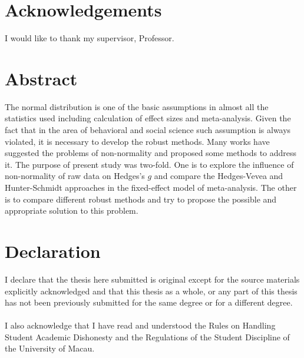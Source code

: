 \documentclass[a4paper, 12pt, twoside]{article}
\begin{document}
\newpage\null\thispagestyle{empty}\newpage

\restoregeometry
\setcounter{page}{1}
\section*{\centering \bf \normalsize{Acknowledgements}}

I would like to thank my supervisor, Professor. \\
\lipsum[1]
\newpage

\section*{\centering \bf \normalsize{Abstract}}
The normal distribution is one of the basic assumptions in almost all the statistics used including calculation of effect sizes and meta-analysis. Given the fact that in the area of behavioral and social science such assumption is always violated, it is necessary to develop the robust methods. Many works have suggested the problems of non-normality and proposed some methods to address it. The purpose of present study was two-fold. One is to explore the influence of non-normality of raw data on Hedges's $g$ and compare the Hedges-Vevea and Hunter-Schmidt approaches in the fixed-effect model of meta-analysis. The other is to compare different robust methods and try to propose the possible and appropriate solution to this problem.
\newpage

\section*{\centering \bf \normalsize{Declaration}}
I declare that the thesis here submitted is original except for the source materials explicitly acknowledged  and that this thesis as a whole, or any part of this thesis has not been previously submitted for the same degree or for a different degree.\\ \\ 
I also acknowledge that I have read and understood the Rules on Handling Student Academic Dishonesty and the Regulations of the Student Discipline of the University of Macau.
\end{document}
